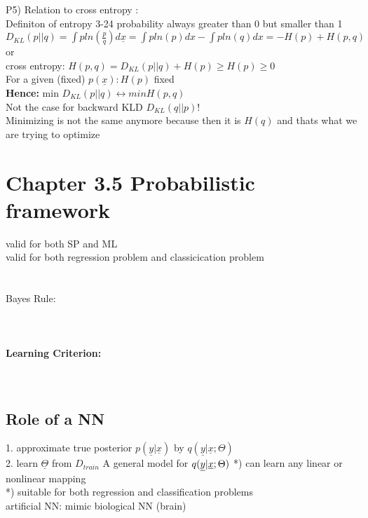 P5) Relation to cross entropy : \\
Definiton of entropy 3-24
probability always greater than 0 but smaller than 1 \\
$
D _ {KL } (p || q) = \int p ln(\frac{p}{q}) d \underline{x} = \int p ln(p) dx - \int p ln(q) dx = - H(p) + H(p,q)  $ or \\
cross entropy: $ H(p,q) = D _ {KL } (p || q) + H(p) \geq H(p) \geq 0$ \\
For a given (fixed) $p(\underline{x}) : H(p)$ fixed \\
\textbf{Hence: } min $D _ {KL } (p || q) \leftrightarrow min H(p,q)$ \\
Not the case for backward KLD $D _ {KL } (q || p)$! \\
Minimizing is not the same anymore because then it is $H(q)$ and thats what we are trying to optimize
\section{Chapter 3.5 Probabilistic framework }
valid for both SP and ML \\
valid for both regression problem and classicication problem \\
 \\
 \\
Bayes Rule: \\
 \\
 \\
 \\
\textbf{Learning Criterion: } \\
 \\
 \\
\subsection{Role of a NN }

1. approximate true posterior $p(\underline{y} | \underline{x}) $ by $ q (\underline{y} | \underline{x} ; \Theta)$ \\
2. learn $\underline{ \Theta }$ from $D_ {train }$
A general model for $ q (\underline{y} | \underline{x} ; \Theta ) \\
$
*) can learn any linear or nonlinear mapping  \\
*) suitable for both regression and classification problems \\
artificial NN: mimic biological NN (brain)
